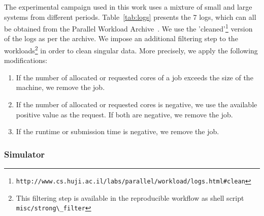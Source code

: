 \documentclass[sigconf,review,anonymous]{acmart}
\begin{document}
The experimental campaign used in this work uses a mixture of small and large
systems from different periods. Table~\ref{tab:logs} presents the 7 logs, which
can all be obtained from the Parallel Workload
Archive~\cite{Feitelson20142967}. We use the
'cleaned'\footnote{\lstinline[basicstyle=\ttfamily\color{blue}]|http://www.cs.huji.ac.il/labs/parallel/workload/logs.html#clean|}
version of the logs as per the archive. We impose an additional filtering step
to the workloads\footnote{This filtering step is available in the reproducible
workflow\cite{repro} as shell script
\lstinline[basicstyle=\ttfamily\color{blue}]|misc/strong\_filter|} in order to
clean singular data. More precisely, we apply the following modifications:

\begin{enumerate}

  \item If the number of allocated or requested cores of a job  exceeds the
    size of the machine, we remove the job.

  \item If the number of allocated or requested cores is negative, we use the
    available positive value as the request. If both are negative, we remove
    the job.

  \item If the runtime or submission time is negative, we remove the job.

\end{enumerate}

\subsubsection{Simulator}
\end{document}

